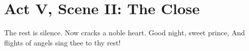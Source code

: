 \section*{Act V, Scene II: The Close}
 The rest is silence.
 Now cracks a noble heart. Good night, sweet prince,
And flights of angels sing thee to thy rest!
